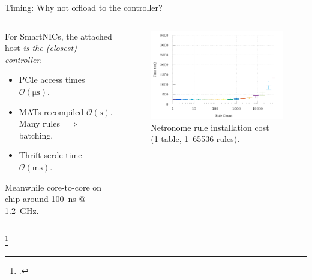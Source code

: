 \documentclass[aspectratio=169,xcolor={dvipsnames}
]{beamer}
\begin{document}
\begin{frame}{Timing: Why not offload to the controller?}
	\begin{columns}
		\begin{column}{0.5\linewidth}
			For SmartNICs, the attached host \emph{is the (closest) controller}.
			
			\begin{itemize}
				\item PCIe access times $\mathcal{O}(\si{\micro\second})$.\footnotemark
				\item MATs recompiled $\mathcal{O}(\si{\second})$. Many rules $\implies$ batching.
				\item Thrift serde time $\mathcal{O}(\si{\milli\second})$.
			\end{itemize}
			
			
			\alert{Meanwhile core-to-core on chip around \SI{100}{\nano\second} @ \SI{1.2}{\giga\hertz}.}
		\end{column}
		\begin{column}{0.5\linewidth}
			\begin{figure}
				\includegraphics[width=0.9\linewidth]{../plots/build/rte-timer/rte-times-logx}
				\caption{Netronome rule installation cost \\(1 table, \numrange{1}{65536} rules).}
			\end{figure}
		\end{column}
	\end{columns}
	
	\footcitetext{DBLP:conf/sigcomm/NeugebauerAZAL018}
\end{frame}
\end{document}
